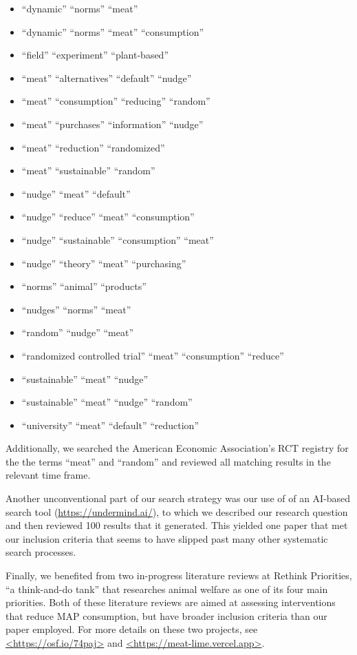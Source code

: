 \documentclass[sn-nature,referee,pdflatex]{sn-jnl}
\providecommand{\tightlist}{%
  \setlength{\itemsep}{0pt}\setlength{\parskip}{0pt}}
\begin{document}
\begin{itemize}
\tightlist
\item
  ``dynamic'' ``norms'' ``meat''
\item
  ``dynamic'' ``norms'' ``meat'' ``consumption''
\item
  ``field'' ``experiment'' ``plant-based''
\item
  ``meat'' ``alternatives'' ``default'' ``nudge''
\item
  ``meat'' ``consumption'' ``reducing'' ``random''
\item
  ``meat'' ``purchases'' ``information'' ``nudge''
\item
  ``meat'' ``reduction'' ``randomized''
\item
  ``meat'' ``sustainable'' ``random''
\item
  ``nudge'' ``meat'' ``default''
\item
  ``nudge'' ``reduce'' ``meat'' ``consumption''
\item
  ``nudge'' ``sustainable'' ``consumption'' ``meat''
\item
  ``nudge'' ``theory'' ``meat'' ``purchasing''
\item
  ``norms'' ``animal'' ``products''
\item
  ``nudges'' ``norms'' ``meat''
\item
  ``random'' ``nudge'' ``meat''
\item
  ``randomized controlled trial'' ``meat'' ``consumption'' ``reduce''
\item
  ``sustainable'' ``meat'' ``nudge''
\item
  ``sustainable'' ``meat'' ``nudge'' ``random''
\item
  ``university'' ``meat'' ``default'' ``reduction''
\end{itemize}

Additionally, we searched the American Economic Association's RCT
registry for the the terms ``meat'' and ``random'' and reviewed all
matching results in the relevant time frame.

Another unconventional part of our search strategy was our use of of an
AI-based search tool (\url{https://undermind.ai/}), to which we
described our research question and then reviewed 100 results that it
generated. This yielded one paper that met our inclusion criteria
\citep{mattson2020} that seems to have slipped past many other
systematic search processes.

Finally, we benefited from two in-progress literature reviews at Rethink
Priorities, ``a think-and-do tank'' that researches animal welfare as
one of its four main priorities. Both of these literature reviews are
aimed at assessing interventions that reduce MAP consumption, but have
broader inclusion criteria than our paper employed. For more details on
these two projects, see \url{<https://osf.io/74paj>} and
\url{<https://meat-lime.vercel.app>}.
\end{document}
